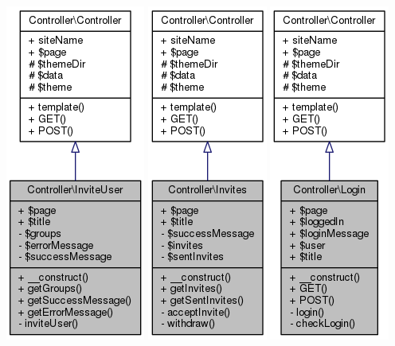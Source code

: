 \documentclass[11pt]{article}
\begin{document}
\includegraphics[scale=0.4]{UML_Controller_1_1InviteUser.png}
\includegraphics[scale=0.4]{UML_Controller_1_1Invites.png}
\includegraphics[scale=0.4]{UML_Controller_1_1Login.png}
\end{document}
